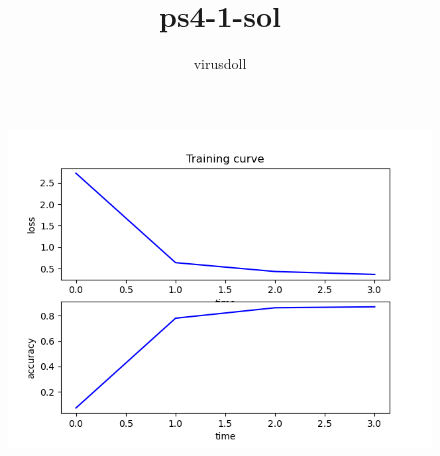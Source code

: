 \documentclass[11pt, a4paper]{article}
\title{ps4-1-sol}
\author{virusdoll}
\begin{document}
    \maketitle
    \begin{figure}[htbp]
        \centering
        \includegraphics[width=\linewidth]{figure/train.png}
    \end{figure}
\end{document}
